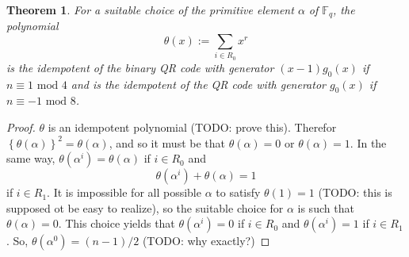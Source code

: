\documentclass{article}
\newcommand{\F}{\mathbb{F}}
\renewcommand{\mod}{\text{ mod }}
\renewcommand{\=}{\equiv}
\newcommand{\set}[1]{\left\{ #1 \right\}}
\theoremstyle{plain}
\newtheorem{thm}{Theorem}[subsection]
\theoremstyle{definition}
\newcommand{\TODO}[1]{(TODO: #1)}
\begin{document}
\begin{thm}
  For a suitable choice of the primitive element $\alpha$ of $\F_q$, the polynomial
  $$ \theta(x) := \sum_{i \in R_0} x^r $$
  is the idempotent of the binary QR code with generator $(x-1) g_0(x)$ if $n \= 1 \mod 4$
  and is the idempotent of the QR code with generator $g_0(x)$ if $n \= -1 \mod 8$.
\end{thm}
\begin{proof}
$\theta$ is an idempotent polynomial \TODO{prove this}.
Therefor $\set{\theta(\alpha)}^2 = \theta(\alpha)$, and so it must be that $\theta(\alpha) = 0$ or $\theta(\alpha) = 1$.
In the same way, $\theta(\alpha^i) = \theta(\alpha)$ if $i \in R_0$ and
$$ \theta(\alpha^i) + \theta(\alpha) = 1 $$
if $i \in R_1$.
It is impossible for all possible $\alpha$ to satisfy $\theta(1) = 1$ \TODO{this is supposed ot be easy to realize}, so the suitable choice for $\alpha$ is such that $\theta(\alpha) = 0$.
This choice yields that $\theta(\alpha^i) = 0$ if $i \in R_0$ and $\theta(\alpha^i) = 1$ if $i \in R_1$.
So, $\theta(\alpha^0) = (n-1)/2$ \TODO{why exactly?}
\end{proof}
\end{document}
